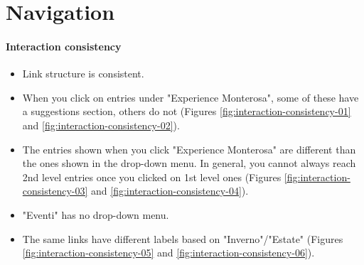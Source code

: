 \documentclass[a4paper, 11pt, parskip=half, headsepline]{scrreprt}
\begin{document}
\section{Navigation}

\paragraph{Interaction consistency}
\begin{itemize}
    \item Link structure is consistent. %
    \item When you click on entries under "Experience Monterosa", some of these have a suggestions section, others do not (Figures \ref{fig:interaction-consistency-01} and \ref{fig:interaction-consistency-02}).
    \item The entries shown when you click "Experience Monterosa" are different than the ones shown in the drop-down menu. In general, you cannot always reach 2nd level entries once you clicked on 1st level ones (Figures \ref{fig:interaction-consistency-03} and \ref{fig:interaction-consistency-04}).
    \item "Eventi" has no drop-down menu.
    \item The same links have different labels based on "Inverno"/"Estate" (Figures \ref{fig:interaction-consistency-05} and \ref{fig:interaction-consistency-06}).
\end{itemize}
\end{document}
